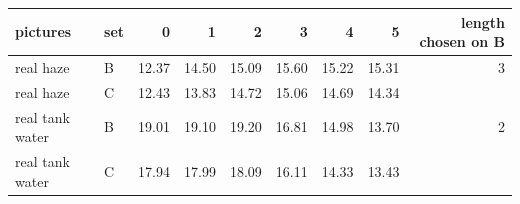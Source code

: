\begin{tabular}{llrrrrrrr}
\toprule
pictures & set & 0 & 1 & 2 & 3 & 4 & 5 & length chosen on B \\
\midrule
real haze & B & 12.37 & 14.50 & 15.09 & 15.60 & 15.22 & 15.31 & 3 \\
real haze & C & 12.43 & 13.83 & 14.72 & 15.06 & 14.69 & 14.34 &  \\
real tank water & B & 19.01 & 19.10 & 19.20 & 16.81 & 14.98 & 13.70 & 2 \\
real tank water & C & 17.94 & 17.99 & 18.09 & 16.11 & 14.33 & 13.43 &  \\
\bottomrule
\end{tabular}
